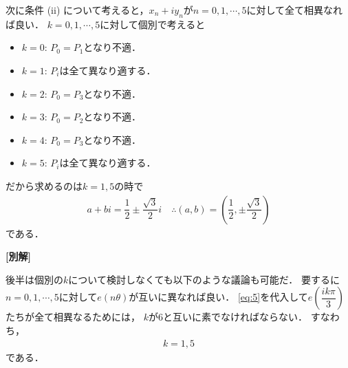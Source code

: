 \documentclass[../../main.tex]{subfiles}
\begin{document}
次に条件 (ii) について考えると，$x_n+iy_n$が$n=0,1,\cdots,5$に対して全て相異なれば良い．
$k=0,1,\cdots,5$に対して個別で考えると
\begin{itemize}
  \item $k=0$: $P_0=P_1$となり不適．
  \item $k=1$: $P_i$は全て異なり適する．
  \item $k=2$: $P_0=P_3$となり不適．
  \item $k=3$: $P_0=P_2$となり不適．
  \item $k=4$: $P_0=P_3$となり不適．
  \item $k=5$: $P_i$は全て異なり適する．
\end{itemize}
だから求めるのは$k=1,5$の時で
\begin{align}
  a+bi = \dfrac{1}{2}\pm \dfrac{\sqrt{3}}{2}i \quad
  \therefore
  (a,b) = \left(\dfrac{1}{2},\pm\dfrac{\sqrt{3}}{2}\right)
\end{align}
である．

{\bf [別解]}

後半は個別の$k$について検討しなくても以下のような議論も可能だ．
要するに$n=0,1,\cdots,5$に対して$e(n\theta)$が互いに異なれば良い．
\cref{eq:5}を代入して$e(\dfrac{ik\pi}{3})$たちが全て相異なるためには，
$k$が$6$と互いに素でなければならない．
すなわち，
\begin{align}
  k = 1, 5
\end{align}
である．
\end{document}
